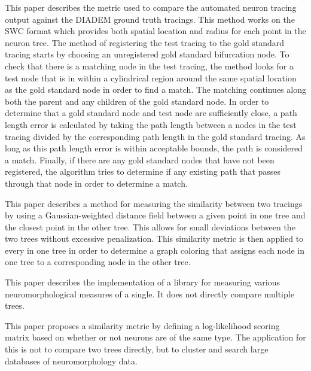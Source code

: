 \documentclass[12pt]{article}
\begin{document}
\begin{enumerate}[label={}]
			This paper describes the metric used to
			compare the automated neuron tracing
			output against the DIADEM ground truth
			tracings. This method works on the SWC
			format which provides both spatial
			location and radius for each point in the
			neuron tree. The method of registering the
			test tracing to the gold standard tracing
			starts by choosing an unregistered gold
			standard bifurcation node. To check that
			there is a matching node in the test
			tracing, the method looks for a test node
			that is in within a cylindrical region
			around the same spatial location as the
			gold standard node in order to find a
			match. The matching continues along both
			the parent and any children of the gold
			standard node. In order to determine that
			a gold standard node and test node are
			sufficiently close, a path length error is
			calculated by taking the path length
			between a nodes in the test tracing
			divided by the corresponding path length
			in the gold standard tracing. As long as
			this path length error is within
			acceptable bounds, the path is considered
			a match. Finally, if there are any gold
			standard nodes that have not been
			registered, the algorithm tries to
			determine if any existing path that passes
			through that node in order to determine a
			match.

			This paper describes a method for
			measuring the similarity between two
			tracings by using a Gaussian-weighted distance
			field between a given point in one tree
			and the closest point in the other
			tree. This allows for small deviations
			between the two trees without excessive
			penalization. This similarity metric is
			then applied to every in one tree in order
			to determine a graph coloring that assigns
			each node in one tree to a corresponding
			node in the other tree.

			This paper describes the implementation of
			a library for measuring various
			neuromorphological measures of a single.
			It does not directly compare multiple
			trees.

			This paper proposes a similarity metric by
			defining a log-likelihood scoring matrix
			based on whether or not neurons are of the
			same type. The application for this is not
			to compare two trees directly, but to
			cluster and search large databases of
			neuromorphology data.
\end{enumerate}
\end{document}
